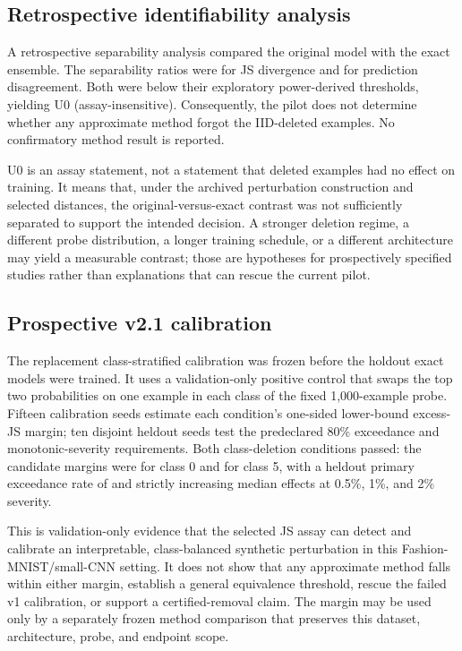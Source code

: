\subsection{Retrospective identifiability analysis}
A retrospective separability analysis compared the original model with the exact
ensemble. The separability ratios were \PilotJSSeparability{} for JS divergence and
\PilotDisagreementSeparability{} for prediction disagreement. Both were below their
exploratory power-derived thresholds, yielding U0 (assay-insensitive). Consequently, the
pilot does not determine whether any approximate method forgot the IID-deleted examples.
No confirmatory method result is reported.

U0 is an assay statement, not a statement that deleted examples had no effect on training.
It means that, under the archived perturbation construction and selected distances, the
original-versus-exact contrast was not sufficiently separated to support the intended
decision. A stronger deletion regime, a different probe distribution, a longer training
schedule, or a different architecture may yield a measurable contrast; those are
hypotheses for prospectively specified studies rather than explanations that can rescue the
current pilot.



\subsection{Prospective v2.1 calibration}
The replacement class-stratified calibration was frozen before the holdout exact models were
trained. It uses a validation-only positive control that swaps the top two probabilities on
one example in each class of the fixed 1,000-example probe. Fifteen calibration seeds estimate
each condition's one-sided lower-bound excess-JS margin; ten disjoint heldout seeds test the
predeclared 80\% exceedance and monotonic-severity requirements. Both class-deletion conditions
passed: the candidate margins were \VTwoOneClassZeroMargin{} for class 0 and
\VTwoOneClassFiveMargin{} for class 5, with a heldout primary exceedance rate of
\VTwoOneHoldoutRate{} and strictly increasing median effects at 0.5\%, 1\%, and 2\% severity.

This is validation-only evidence that the selected JS assay can detect and calibrate an
interpretable, class-balanced synthetic perturbation in this Fashion-MNIST/small-CNN setting.
It does not show that any approximate method falls within either margin, establish a general
equivalence threshold, rescue the failed v1 calibration, or support a certified-removal claim.
The margin may be used only by a separately frozen method comparison that preserves this
dataset, architecture, probe, and endpoint scope.


